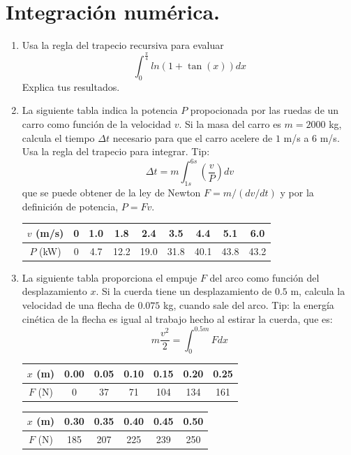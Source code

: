 \documentclass[11pt]{article}
\begin{document}
\section{Integración numérica.}
\begin{enumerate}
\item Usa la regla del trapecio recursiva para evaluar
\[ \int_{0}^{\frac{\pi}{4}} ln(1 + \tan(x)) dx\]
Explica tus resultados.
\item La siguiente tabla indica la potencia $P$ propocionada por las ruedas de un carro como función de la velocidad $v$. Si la masa del carro es $m=2000$ kg, calcula el tiempo $\Delta t$ necesario para que el carro acelere de $1$ m/s a $6$ m/s. Usa la regla del trapecio para integrar. Tip:
\[ \Delta t = m \int_{1s}^{6s} \left( \dfrac{v}{P} \right) dv\]
que se puede obtener de la ley de Newton $F= m/(dv/dt)$ y por la definición de potencia, $P=Fv$.
\begin{center}
\begin{tabular}{c | c | c | c | c | c | c | c | c}
$v$ (m/s) & 0 & 1.0 & 1.8 & 2.4 & 3.5 & 4.4 & 5.1 & 6.0 \\ \hline
$P$ (kW)  & 0 & 4.7 & 12.2 & 19.0 & 31.8 & 40.1 & 43.8 & 43.2 
\end{tabular}
\end{center}
\item La siguiente tabla proporciona el empuje $F$ del arco como función del desplazamiento $x$. Si la cuerda tiene un desplazamiento de $0.5$ m, calcula la velocidad de una flecha de $0.075$ kg, cuando sale del arco. Tip: la energía cinética de la flecha es igual al trabajo hecho al estirar la cuerda, que es:
\[ m \dfrac{v^{2}}{2} = \int_{0}^{0.5m} F dx\]
\begin{center}
\begin{tabular}{c | c | c | c | c | c | c |}
$x$ (m) & 0.00 & 0.05 & 0.10 & 0.15 & 0.20 & 0.25  \\ \hline
$F$ (N)  & 0 & 37 & 71 & 104 & 134 & 161
\end{tabular}
\end{center}
\begin{center}
\begin{tabular}{c | c | c | c | c | c | }
$x$ (m) & 0.30 & 0.35 & 0.40 & 0.45 & 0.50 \\ \hline
$F$ (N)  & 185 & 207 & 225 & 239 & 250 
\end{tabular}
\end{center}
\begin{figure}[H]
	\centering

\end{figure}
\end{enumerate}
\end{document}
